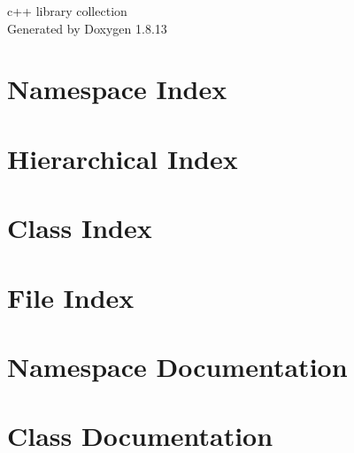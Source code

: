 \documentclass[twoside]{book}
\newcommand{\+}{\discretionary{\mbox{\scriptsize$\hookleftarrow$}}{}{}}
\newcommand{\clearemptydoublepage}{%
  \newpage{\pagestyle{empty}\cleardoublepage}%
}
\begin{document}
\hypersetup{pageanchor=false,
             bookmarksnumbered=true,
             pdfencoding=unicode
            }
\begin{titlepage}
\vspace*{7cm}
\begin{center}%
{\Large c++ library collection }\\
\vspace*{1cm}
{\large Generated by Doxygen 1.8.13}\\
\end{center}
\end{titlepage}
\clearemptydoublepage
{}
\tableofcontents
\clearemptydoublepage
{}
\hypersetup{pageanchor=true}

\chapter{Namespace Index}

\chapter{Hierarchical Index}

\chapter{Class Index}

\chapter{File Index}

\chapter{Namespace Documentation}







\chapter{Class Documentation}






















\end{document}
